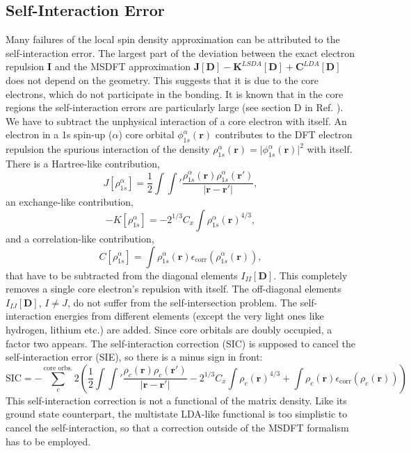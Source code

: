 \documentclass[journal=jacsat,manuscript=article]{achemso}
\newcommand\m[1]{\mathbf{#1}}
\renewcommand\vec[1]{\mathbf{#1}}
\begin{document}
\subsection{Self-Interaction Error}
Many failures of the local spin density approximation can be attributed to the self-interaction error. \cite{Perdew1981}
The largest part of the deviation between the exact electron repulsion $\m{I}$ and
the MSDFT approximation $\m{J}[\m{D}]-\m{K}^{LSDA}[\m{D}] + \m{C}^{LDA}[\m{D}]$ does not depend on the geometry.
This suggests that it is due to the core electrons, which do not participate in the bonding.
It is known that in the core regions the self-interaction errors are particularly large (see section D in Ref. \cite{Tsuneda2014}).
We have to subtract the unphysical interaction of a core electron with itself. An electron in a 1s spin-up ($\alpha$) core orbital $\phi^{\alpha}_{1s}(\vec{r})$
contributes to the DFT electron repulsion the spurious interaction of the density $\rho^{\alpha}_{1s}(\vec{r}) = \vert \phi^{\alpha}_{1s}(\vec{r})\vert^2$
with itself. There is a Hartree-like contribution,
\begin{equation}
J[\rho^{\alpha}_{1s}] = \frac{1}{2} \int \int' \frac{\rho^{\alpha}_{1s}(\vec{r}) \rho^{\alpha}_{1s}(\vec{r}')}{\vert \vec{r} - \vec{r}' \vert},
\end{equation}
an exchange-like contribution,
\begin{equation}
-K[\rho^{\alpha}_{1s}] = - 2^{1/3} C_x \int \rho^{\alpha}_{1s}(\vec{r})^{4/3},
\end{equation}
and a correlation-like contribution,
\begin{equation}
C[\rho^{\alpha}_{1s}] = \int \rho^{\alpha}_{1s}(\vec{r}) \epsilon_{\text{corr}}(\rho^{\alpha}_{1s}(\vec{r})),
\end{equation}
that have to be subtracted from the diagonal elements $I_{II}[\m{D}]$.
This completely removes a single core electron's repulsion with itself.
The off-diagonal elements $I_{IJ}[\m{D}]$, $I \neq J$, do not suffer from the self-intersection problem.
The self-interaction energies from different elements (except the very light ones like hydrogen, lithium etc.) are added.
Since core orbitals are doubly occupied, a factor two appears.
The self-interaction correction (SIC) is supposed to cancel the self-interaction error (SIE), so there is a minus sign in front:
\begin{equation}
\text{SIC} = - \sum_{c}^{\text{core orbs.}} 2 \left(
  \frac{1}{2} \int \int' \frac{\rho_{c}(\vec{r}) \rho_{c}(\vec{r}')}{\vert \vec{r} - \vec{r}' \vert}
  - 2^{1/3} C_x \int \rho_c(\vec{r})^{4/3}
  + \int \rho_c(\vec{r}) \epsilon_{\text{corr}}(\rho_c(\vec{r}))
 \right)
\end{equation}
This self-interaction correction is not a functional of the matrix density. Like its ground state counterpart,
the multistate 
LDA-like
functional is too simplistic to cancel the self-interaction, so that a correction
outside of the MSDFT formalism has to be employed.
\end{document}
